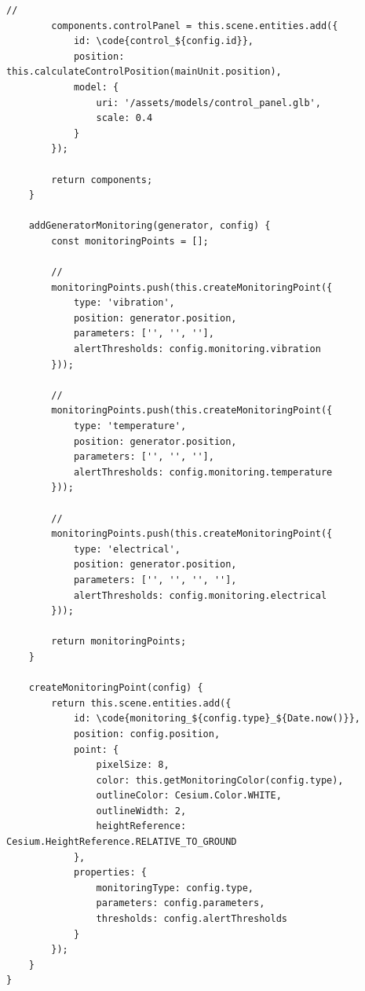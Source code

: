 \begin{lstlisting}[style=javascript]
        // 
        components.controlPanel = this.scene.entities.add({
            id: \code{control_${config.id}},
            position: this.calculateControlPosition(mainUnit.position),
            model: {
                uri: '/assets/models/control_panel.glb',
                scale: 0.4
            }
        });
        
        return components;
    }
    
    addGeneratorMonitoring(generator, config) {
        const monitoringPoints = [];
        
        // 
        monitoringPoints.push(this.createMonitoringPoint({
            type: 'vibration',
            position: generator.position,
            parameters: ['', '', ''],
            alertThresholds: config.monitoring.vibration
        }));
        
        // 
        monitoringPoints.push(this.createMonitoringPoint({
            type: 'temperature',
            position: generator.position,
            parameters: ['', '', ''],
            alertThresholds: config.monitoring.temperature
        }));
        
        // 
        monitoringPoints.push(this.createMonitoringPoint({
            type: 'electrical',
            position: generator.position,
            parameters: ['', '', '', ''],
            alertThresholds: config.monitoring.electrical
        }));
        
        return monitoringPoints;
    }
    
    createMonitoringPoint(config) {
        return this.scene.entities.add({
            id: \code{monitoring_${config.type}_${Date.now()}},
            position: config.position,
            point: {
                pixelSize: 8,
                color: this.getMonitoringColor(config.type),
                outlineColor: Cesium.Color.WHITE,
                outlineWidth: 2,
                heightReference: Cesium.HeightReference.RELATIVE_TO_GROUND
            },
            properties: {
                monitoringType: config.type,
                parameters: config.parameters,
                thresholds: config.alertThresholds
            }
        });
    }
}
\end{lstlisting}

\hypertarget{section-81}{%
\subsection{}\label{section-81}}

